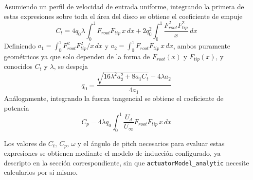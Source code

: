 Asumiendo un perfil de velocidad de entrada uniforme, integrando la primera de estas expresiones sobre toda el área del disco se obtiene el coeficiente de empuje
\begin{equation}
C_t = 4 q_0 \lambda \int_0^1 F_{root}F_{tip}\, x\, dx + 2 q_0^2 \int_0^1 \frac{F_{root}^2 F_{tip}^2}{x}\, dx
\label{eq:analitico_Ct}
\end{equation}
Definiendo $a_1 = \int_0^1 F_{root}^2 F_{tip}^2/x\, dx$ y $a_2 = \int_0^1 F_{root}F_{tip}\, x\, dx$, ambos puramente geométricos ya que solo dependen de la forma de $F_{root}(x)$ y $F_{tip}(x)$, y conocidos $C_t$ y $\lambda$, se despeja
\begin{equation}
q_0 = \frac{\sqrt{16\lambda^2 a_2^2 + 8 a_1 C_t} - 4\lambda a_2}{4 a_1}
\label{eq:analitico_q0_despejado}
\end{equation}
Análogamente, integrando la fuerza tangencial se obtiene el coeficiente de potencia
\begin{equation}
C_p = 4\lambda q_0 \int_0^1 \frac{U_d}{U_\infty} F_{root}F_{tip}\, x\, dx
\label{eq:analitico_Cp}
\end{equation}

Los valores de $C_t$, $C_p$, $\omega$ y el ángulo de pitch necesarios para evaluar estas expresiones se obtienen mediante el modelo de inducción configurado, ya descripto en la sección correspondiente, sin que \texttt{actuatorModel\_analytic} necesite calcularlos por sí mismo.

